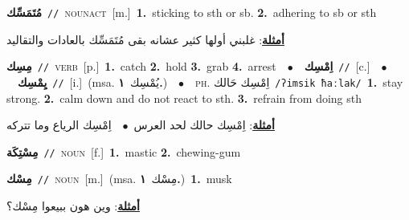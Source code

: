 \documentclass[10pt,a4paper,twoside]{article} %
\begin{document}
\begin{multicols}{2}
{\setlength\topsep{0pt}\textbf{\foreignlanguage{arabic}{مُتَمَسِّك}}\ {\color{gray}\texttt{//}\color{black}}\ \textsc{noun\textunderscore act}\ [m.]\ \textbf{1.}~sticking to sth or sb.  \textbf{2.}~adhering to sb or sth\  \begin{flushright}\color{gray}\foreignlanguage{arabic}{\textbf{\underline{\foreignlanguage{arabic}{أمثلة}}}: غلبني أولها كثير عشانه بقى مُتَمَسِّك بالعادات والتقاليد}\end{flushright}\color{black}} \vspace{2mm}

{\setlength\topsep{0pt}\textbf{\foreignlanguage{arabic}{مِسِك}}\ {\color{gray}\texttt{//}\color{black}}\ \textsc{verb}\ [p.]\ \textbf{1.}~catch  \textbf{2.}~hold  \textbf{3.}~grab  \textbf{4.}~arrest\ \ $\bullet$\ \ \setlength\topsep{0pt}\textbf{\foreignlanguage{arabic}{اِمْسِك}}\ {\color{gray}\texttt{//}\color{black}}\ [c.]\ \ $\bullet$\ \ \setlength\topsep{0pt}\textbf{\foreignlanguage{arabic}{يِمْسِك}}\ {\color{gray}\texttt{//}\color{black}}\ [i.]\ \color{gray}(msa. \foreignlanguage{arabic}{يُمْسِك}~\foreignlanguage{arabic}{\textbf{١.}})\color{black}\ \ $\bullet$\ \ \textsc{ph.} \color{gray} \foreignlanguage{arabic}{اِمْسِك حَالك}\color{black}\ {\color{gray}\texttt{/{\sffamily ʔimsik ħaːlak}/}\color{black}}\ \textbf{1.}~stay strong.  \textbf{2.}~calm down and do not react to sth.  \textbf{3.}~refrain from doing sth\  \begin{flushright}\color{gray}\foreignlanguage{arabic}{\textbf{\underline{\foreignlanguage{arabic}{أمثلة}}}: اِمْسِك حالك لحد العرس\ $\bullet$\ \  اِمْسِك الرياع وما تتركه}\end{flushright}\color{black}} \vspace{2mm}

{\setlength\topsep{0pt}\textbf{\foreignlanguage{arabic}{مِسْتِكَة}}\ {\color{gray}\texttt{//}\color{black}}\ \textsc{noun}\ [f.]\ \textbf{1.}~mastic  \textbf{2.}~chewing-gum\ } \vspace{2mm}

{\setlength\topsep{0pt}\textbf{\foreignlanguage{arabic}{مِسْك}}\ {\color{gray}\texttt{//}\color{black}}\ \textsc{noun}\ [m.]\ \color{gray}(msa. \foreignlanguage{arabic}{مِسْك}~\foreignlanguage{arabic}{\textbf{١.}})\color{black}\ \textbf{1.}~musk\  \begin{flushright}\color{gray}\foreignlanguage{arabic}{\textbf{\underline{\foreignlanguage{arabic}{أمثلة}}}: وين هون ببيعوا مِسْك؟}\end{flushright}\color{black}} \vspace{2mm}


\end{multicols}
\end{document}
